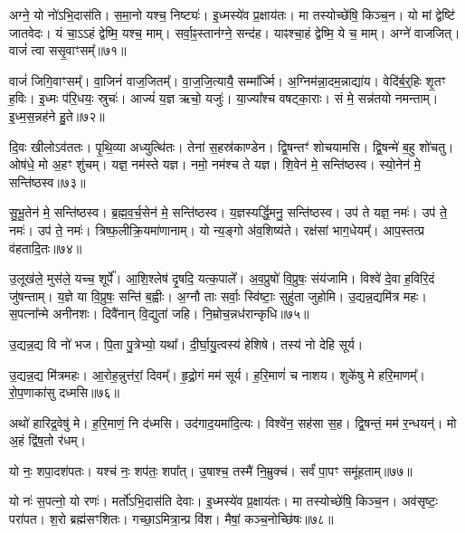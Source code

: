अग्ने॒ यो नो॑\-ऽभि॒दास॑ति।
स॒मा॒नो यश्च॒ निष्ट्यः॑।
इ॒ध्मस्ये॑व प्र॒क्षाय॑तः।
मा तस्योच्छे॑षि॒ किञ्च॒न।
यो मां द्वेष्टि॑ जातवेदः।
यं चा॒ऽऽहं द्वेष्मि॒ यश्च॒ माम्।
सर्वा॒ꣴ॒स्तान॑ग्ने॒ सन्द॑ह।
याꣴश्चा॒हं द्वेष्मि॒ ये च॒ माम्।
अग्ने॑ वाजजित्।
वाजं॑ त्वा ससृ॒वाꣳसम्᳚॥७१॥

वाजं॑ जिगि॒वाꣳसम्᳚।
वा॒जिनं॑ वाज॒जितम्᳚।
वा॒ज॒जि॒त्यायै॒ सम्मा᳚र्ज्मि।
अ॒ग्निम॑न्ना॒दम॒न्नाद्या॑य।
वेदि॑र्ब॒र्॒हिः शृ॒तꣳ ह॒विः।
इ॒ध्मः प॑रि॒धयः॒ स्रुचः॑।
आज्यं॑ य॒ज्ञ ऋचो॒ यजुः॑।
या॒ज्या᳚श्च वषट्का॒राः।
सं मे॒ सन्न॑तयो नमन्ताम्।
इ॒ध्म॒स॒न्नह॑ने हु॒ते॥७२॥

दि॒वः खीलो\-ऽव॑ततः।
पृ॒थि॒व्या अध्युत्थि॑तः।
तेना॑ स॒हस्र॑काण्डेन।
द्वि॒षन्तꣳ॑ शोचयामसि।
द्वि॒षन्मे॑ ब॒हु शो॑चतु।
ओष॑धे॒ मो अ॒हꣳ शु॑चम्।
यज्ञ॒ नम॑स्ते यज्ञ।
नमो॒ नम॑श्च ते यज्ञ।
शि॒वेन॑ मे॒ सन्ति॑ष्ठस्व।
स्यो॒नेन॑ मे॒ सन्ति॑ष्ठस्व॥७३॥

सु॒भू॒तेन॑ मे॒ सन्ति॑ष्ठस्व।
ब्र॒ह्म॒व॒र्च॒सेन॑ मे॒ सन्ति॑ष्ठस्व।
य॒ज्ञस्यर्द्धि॒मनु॒ सन्ति॑ष्ठस्व।
उप॑ ते यज्ञ॒ नमः॑।
उप॑ ते॒ नमः॑।
उप॑ ते॒ नमः॑।
त्रिष्फ॒लीक्रि॒यमा॑णानाम्।
यो न्य॒ङ्गो अ॑व॒शिष्य॑ते।
रक्ष॑सां भाग॒धेयम्᳚।
आप॒स्तत्प्र व॑हतादि॒तः॥७४॥

उ॒लूख॑ले॒ मुस॑ले॒ यच्च॒ शूर्पे᳚।
आ॒शि॒श्लेष॑ दृ॒षदि॒ यत्क॒पाले᳚।
अ॒व॒प्रुषो॑ वि॒प्रुषः॒ संय॑जामि।
विश्वे॑ दे॒वा ह॒विरि॒दं जु॑षन्ताम्।
य॒ज्ञे या वि॒प्रुषः॒ सन्ति॑ ब॒ह्वीः।
अ॒ग्नौ ताः सर्वाः॒ स्वि॑ष्टाः॒ सुहु॑ता जुहोमि।
उ॒द्यन्न॒द्यमि॑त्र महः।
स॒पत्ना᳚न्मे अनीनशः।
दिवै॑नान् वि॒द्युता॑ जहि।
नि॒म्रोच॒न्नध॑रान्कृधि॥७५॥

उ॒द्यन्न॒द्य वि नो॑ भज।
पि॒ता पु॒त्रेभ्यो॒ यथा᳚।
दी॒र्घा॒यु॒त्वस्य॑ हेशिषे।
तस्य॑ नो देहि सूर्य।


उ॒द्यन्न॒द्य मि॑त्रमहः।
आ॒रोह॒न्नुत्त॑रां॒ दिवम्᳚।
हृ॒द्रो॒गं मम॑ सूर्य।
ह॒रि॒माणं॑ च नाशय।
शुके॑षु मे हरि॒माणम्᳚।
रो॒प॒णाका॑सु दध्मसि॥७६॥

अथो॑ हारिद्र॒वेषु॑ मे।
ह॒रि॒माणं॒ नि द॑ध्मसि।
उद॑गाद॒यमा॑दि॒त्यः।
विश्वे॑न॒ सह॑सा स॒ह।
द्वि॒षन्तं॒ मम॑ र॒न्धयन्॑।
मो अ॒हं द्वि॑ष॒तो र॑धम्।

{\small \closesub{}}

यो नः॒ शपा॒दश॑पतः।
यश्च॑ नः॒ शप॑तः॒ शपा᳚त्।
उ॒षाश्च॒ तस्मै॑ नि॒म्रुक्च॑।
सर्वं॑ पा॒पꣳ समू॑हताम्॥७७॥

यो नः॑ स॒पत्नो॒ यो रणः॑।
मर्तो॑\-ऽभि॒दास॑ति देवाः।
इ॒ध्मस्ये॑व प्र॒क्षाय॑तः।
मा तस्योच्छे॑षि॒ किञ्च॒न।
अव॑सृष्टः॒ परा॑पत।
श॒रो ब्रह्म॑सꣳशितः।
गच्छा॒\-ऽमित्रा॒न्प्र वि॑श।
मैषां॒ कञ्च॒नोच्छि॑षः॥७८॥

